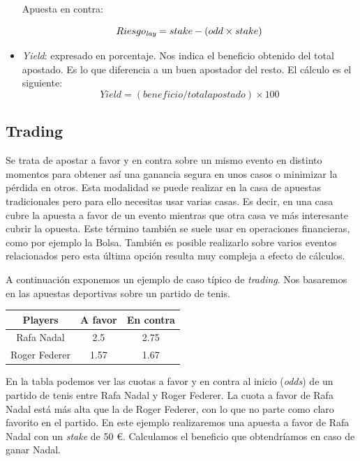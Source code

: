 \begin{itemize}
	Apuesta en contra:
	
 \begin{displaymath}
 Riesgo_\emph{lay} = stake - (odd \times stake)
\end{displaymath}

\item \emph{Yield}: expresado en porcentaje. Nos indica el beneficio obtenido del total apostado. Es lo que diferencia a un buen apostador del resto. El cálculo es el siguiente:
\begin{displaymath}
 Yield = (beneficio / total apostado) \times 100 
\end{displaymath}
\end{itemize} 


 
 \subsection{Trading}
 
 Se trata de apostar a favor y en contra sobre un mismo evento en distinto momentos para obtener así una ganancia segura en unos casos o minimizar la pérdida en otros.  Esta modalidad se puede realizar en la casa de apuestas tradicionales pero para ello necesitas usar varias casas.  Es decir, en una casa cubre la apuesta a favor de un evento mientras que otra casa ve más interesante cubrir la opuesta. Este término también se suele usar en operaciones financieras, como por ejemplo la Bolsa. También es posible realizarlo sobre varios eventos relacionados pero esta última opción resulta muy compleja a efecto de cálculos.
 
A continuación exponemos un ejemplo de caso típico de \emph{trading}. Nos basaremos en las apuestas deportivas sobre un partido de tenis.
 
 \begin{center}
    \begin{tabular}{| c | c | c |}
      \hline
      \hline
      \textbf{Players} & \textbf{A favor} & \textbf{En contra}\\
      \hline
      \hline
      Rafa Nadal & 2.5 & 2.75\\
      \hline
      \hline
      Roger Federer & 1.57 & 1.67\\
      \hline
      \hline
    \end{tabular}
  \end{center}


En la tabla podemos ver las cuotas a favor y en contra al inicio (\emph{odds}) de un partido de tenis entre Rafa Nadal y Roger Federer. La cuota a favor de Rafa Nadal está más alta que la de Roger Federer, con lo que no parte como claro favorito en el partido. En este ejemplo realizaremos una apuesta a favor de Rafa Nadal con un \emph{stake} de 50 \euro . Calculamos el beneficio que obtendríamos en caso de ganar Nadal.

